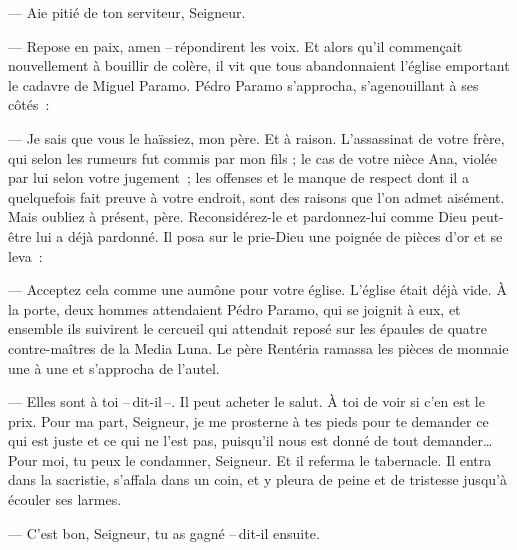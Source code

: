 \begin{pages}
\begin{Rightside}
			--- Aie pitié de ton serviteur, Seigneur.

			--- Repose en paix, amen --\,répondirent les voix.
		\pend
		\pstart
			Et alors qu'il commençait nouvellement à bouillir de colère, il vit que tous abandonnaient l'église emportant le cadavre de Miguel Paramo.
		\pend
		\pstart
			Pédro Paramo s'approcha, s'agenouillant à ses côtés :

			--- Je sais que vous le haïssiez, mon père. Et à raison. L'assassinat de votre frère, qui selon les rumeurs fut commis par mon fils ; le cas de votre nièce Ana, violée par lui selon votre jugement ; les offenses et le manque de respect dont il a quelquefois fait preuve à votre endroit, sont des raisons que l'on admet aisément. Mais oubliez à présent, père. Reconsidérez-le et pardonnez-lui comme Dieu peut-être lui a déjà pardonné.
		\pend
		\pstart
			Il posa sur le prie-Dieu une poignée de pièces d'or et se leva :

			--- Acceptez cela comme une aumône pour votre église.
		\pend
		\pstart
			L'église était déjà vide. À la porte, deux hommes attendaient Pédro Paramo, qui se joignit à eux, et ensemble ils suivirent le cercueil qui attendait reposé sur les épaules de quatre contre-maîtres de la Media Luna.
		\pend
		\pstart
			Le père Rentéria ramassa les pièces de monnaie une à une et s'approcha de l'autel.

			--- Elles sont à toi --\,dit-il\,--. Il peut acheter le salut. À toi de voir si c'en est le prix. Pour ma part, Seigneur, je me prosterne à tes pieds pour te demander ce qui est juste et ce qui ne l'est pas, puisqu'il nous est donné de tout demander\ldots Pour moi, tu peux le condamner, Seigneur.
		\pend
		\pstart
			Et il referma le tabernacle.
		\pend
		\pstart
			Il entra dans la sacristie, s'affala dans un coin, et y pleura de peine et de tristesse jusqu'à écouler ses larmes.

			--- C'est bon, Seigneur, tu as gagné --\,dit-il ensuite.
		\pend
		\endnumbering
	\end{Rightside}

\end{pages}
\Pages
